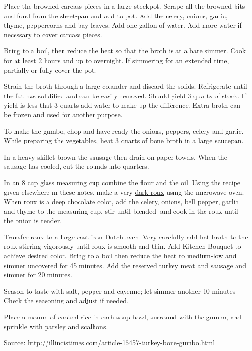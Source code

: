 \documentclass[letterpaper]{recipePMG}
\begin{document}
Place the browned carcass pieces in a large stockpot. Scrape all the browned bits and fond from the sheet-pan and add to pot. Add the celery, onions, garlic, thyme, peppercorns and bay leaves. Add one gallon of water.  Add more water if necessary to cover carcass pieces. 

Bring to a boil, then reduce the heat so that the broth is at a bare simmer. Cook for at least 2 hours and up to overnight. If simmering for an extended time, partially or fully cover the pot. 

Strain the broth through a large colander and discard the solids. Refrigerate until the fat has solidified and can be easily removed. Should yield 3 quarts of stock.  If yield is less that 3 quarts add water to make up the difference. Extra broth can be frozen and used for another purpose.

To make the gumbo, chop and have ready the onions, peppers, celery and garlic. While preparing the vegetables, heat 3 quarts of bone broth in a large saucepan. 

In a heavy skillet brown the sausage then drain on paper towels. When the sausage has cooled, cut the rounds into quarters.

In an 8 cup glass measuring cup combine the flour and the oil.  Using the recipe given elsewhere in these notes, make a very \hyperref[BrownRoux]{dark roux} using the microwave oven. When roux is a deep chocolate color, add the celery, onions, bell pepper, garlic and thyme to the measuring cup, stir until blended, and cook in the roux until the onion is tender. 

Transfer roux to a large cast-iron Dutch oven. Very carefully add hot broth to the roux stirring vigorously until roux is smooth and thin. Add Kitchen Bouquet to achieve desired color. Bring to a boil then reduce the heat to medium-low and simmer uncovered for 45 minutes. Add the reserved turkey meat and sausage and simmer for 20 minutes.

Season to taste with salt, pepper and cayenne; let simmer another 10 minutes. Check the seasoning and adjust if needed.

Place a mound of cooked rice in each soup bowl, surround with the gumbo, and sprinkle with parsley and scallions.

Source: http://illinoistimes.com/article-16457-turkey-bone-gumbo.html

\newpage

\label{BrownRoux}
\end{document}
